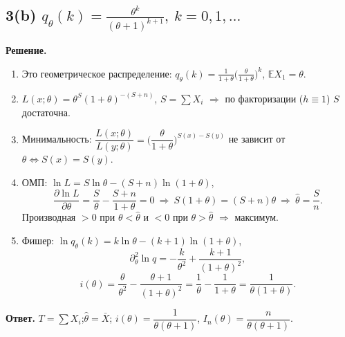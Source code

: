 \documentclass[12pt,a4paper]{article}
\newcommand{\E}{\mathbb{E}}
\newcommand{\sol}{\par\noindent\textbf{Решение.} }
\newcommand{\ans}{\par\smallskip\noindent\textbf{Ответ.} }
\begin{document}
\subsection*{3(b) \quad $q_\theta(k)=\frac{\theta^k}{(\theta+1)^{k+1}},\ k=0,1,\dots$}
\sol
\begin{enumerate}
  \item Это геометрическое распределение:
        $q_\theta(k)=\frac1{1+\theta}\big(\frac\theta{1+\theta}\big)^k$,
        $\E X_1=\theta$.
  \item $L(x;\theta)=\theta^{S}(1+\theta)^{-(S+n)}$, $S=\sum X_i$
        $\Rightarrow$ по факторизации ($h\equiv1$) $S$ достаточна.
  \item Минимальность: $\dfrac{L(x;\theta)}{L(y;\theta)}
        =\Big(\dfrac{\theta}{1+\theta}\Big)^{S(x)-S(y)}$ не зависит от
        $\theta\iff S(x)=S(y)$.
  \item ОМП: $\ln L=S\ln\theta-(S+n)\ln(1+\theta)$,
  \[
    \frac{\partial\ln L}{\partial\theta}=\frac S\theta-\frac{S+n}{1+\theta}=0
    \ \Rightarrow\ S(1+\theta)=(S+n)\theta\ \Rightarrow\ \hat\theta=\frac Sn.
  \]
  Производная $>0$ при $\theta<\hat\theta$ и $<0$ при $\theta>\hat\theta$
  $\Rightarrow$ максимум.
  \item Фишер: $\ln q_\theta(k)=k\ln\theta-(k+1)\ln(1+\theta)$,
  \[
    \partial^2_\theta\ln q=-\frac{k}{\theta^2}+\frac{k+1}{(1+\theta)^2},
  \]
  \[
    i(\theta)=\frac{\theta}{\theta^2}-\frac{\theta+1}{(1+\theta)^2}
    =\frac1\theta-\frac1{1+\theta}=\frac1{\theta(1+\theta)}.
  \]
\end{enumerate}
\ans $T=\sum X_i$;\quad $\hat\theta=\bar X$;\quad
$i(\theta)=\dfrac{1}{\theta(\theta+1)}$, $I_n(\theta)=\dfrac{n}{\theta(\theta+1)}$.
\end{document}
